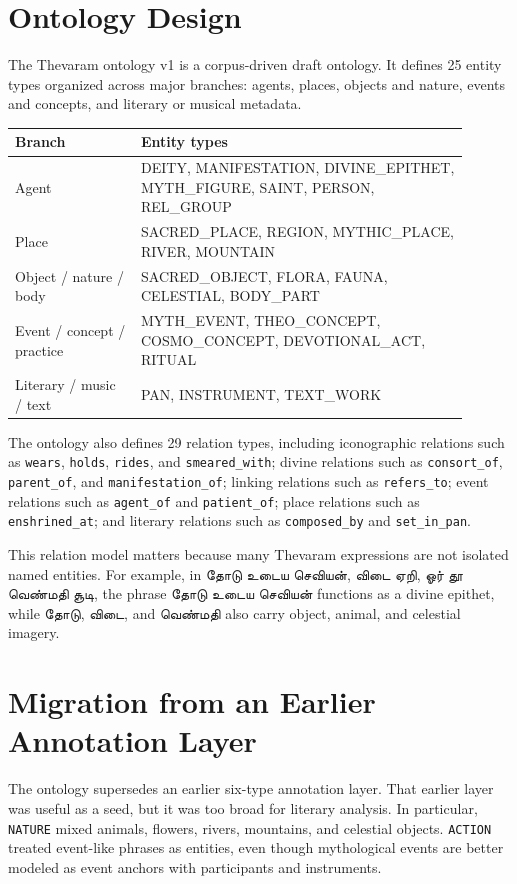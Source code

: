 \documentclass[11pt]{article}
\newcommand{\ta}[1]{{\tamilfont #1}}
\begin{document}
\section{Ontology Design}
The Thevaram ontology v1 is a corpus-driven draft ontology. It defines 25 entity types organized across major branches: agents, places, objects and nature, events and concepts, and literary or musical metadata.

\begin{longtable}{p{0.25\linewidth}p{0.65\linewidth}}
\toprule
Branch & Entity types \\
\midrule
Agent & DEITY, MANIFESTATION, DIVINE\_EPITHET, MYTH\_FIGURE, SAINT, PERSON, REL\_GROUP \\
Place & SACRED\_PLACE, REGION, MYTHIC\_PLACE, RIVER, MOUNTAIN \\
Object / nature / body & SACRED\_OBJECT, FLORA, FAUNA, CELESTIAL, BODY\_PART \\
Event / concept / practice & MYTH\_EVENT, THEO\_CONCEPT, COSMO\_CONCEPT, DEVOTIONAL\_ACT, RITUAL \\
Literary / music / text & PAN, INSTRUMENT, TEXT\_WORK \\
\bottomrule
\end{longtable}

The ontology also defines 29 relation types, including iconographic relations such as \texttt{wears}, \texttt{holds}, \texttt{rides}, and \texttt{smeared\_with}; divine relations such as \texttt{consort\_of}, \texttt{parent\_of}, and \texttt{manifestation\_of}; linking relations such as \texttt{refers\_to}; event relations such as \texttt{agent\_of} and \texttt{patient\_of}; place relations such as \texttt{enshrined\_at}; and literary relations such as \texttt{composed\_by} and \texttt{set\_in\_pan}.

This relation model matters because many Thevaram expressions are not isolated named entities. For example, in \ta{தோடு உடைய செவியன், விடை ஏறி, ஓர் தூ வெண்மதி சூடி}, the phrase \ta{தோடு உடைய செவியன்} functions as a divine epithet, while \ta{தோடு}, \ta{விடை}, and \ta{வெண்மதி} also carry object, animal, and celestial imagery.

\section{Migration from an Earlier Annotation Layer}
The ontology supersedes an earlier six-type annotation layer. That earlier layer was useful as a seed, but it was too broad for literary analysis. In particular, \texttt{NATURE} mixed animals, flowers, rivers, mountains, and celestial objects. \texttt{ACTION} treated event-like phrases as entities, even though mythological events are better modeled as event anchors with participants and instruments.
\end{document}
